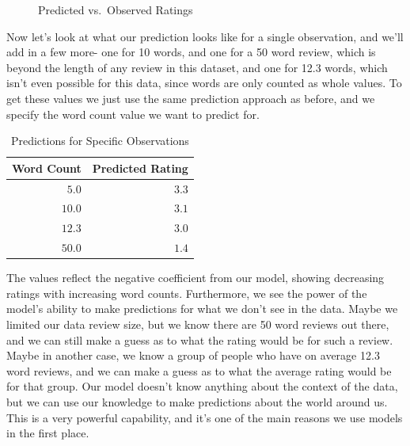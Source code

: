 \documentclass[
  letterpaper,
]{krantz}
\begin{document}
\begin{figure}[H]


\caption{\label{fig-my-first-model-predictions-plot}Predicted
vs.~Observed Ratings}

\end{figure}%

Now let's look at what our prediction looks like for a single
observation, and we'll add in a few more- one for 10 words, and one for
a 50 word review, which is beyond the length of any review in this
dataset, and one for 12.3 words, which isn't even possible for this
data, since words are only counted as whole values. To get these values
we just use the same prediction approach as before, and we specify the
word count value we want to predict for.

\begin{longtable}{rr}

\caption{\label{tbl-predictions}Predictions for Specific Observations}

\tabularnewline

\toprule
Word Count & Predicted Rating \\ 
\midrule\addlinespace[2.5pt]
\textcolor[HTML]{404040}{$5.0$} & \textcolor[HTML]{404040}{$3.3$} \\ 
\textcolor[HTML]{404040}{$10.0$} & \textcolor[HTML]{404040}{$3.1$} \\ 
\textcolor[HTML]{404040}{$12.3$} & \textcolor[HTML]{404040}{$3.0$} \\ 
\textcolor[HTML]{404040}{$50.0$} & \textcolor[HTML]{404040}{$1.4$} \\ 
\bottomrule

\end{longtable}

The values reflect the negative coefficient from our model, showing
decreasing ratings with increasing word counts. Furthermore, we see the
power of the model's ability to make predictions for what we don't see
in the data. Maybe we limited our data review size, but we know there
are 50 word reviews out there, and we can still make a guess as to what
the rating would be for such a review. Maybe in another case, we know a
group of people who have on average 12.3 word reviews, and we can make a
guess as to what the average rating would be for that group. Our model
doesn't know anything about the context of the data, but we can use our
knowledge to make predictions about the world around us. This is a very
powerful capability, and it's one of the main reasons we use models in
the first place.
\end{document}
